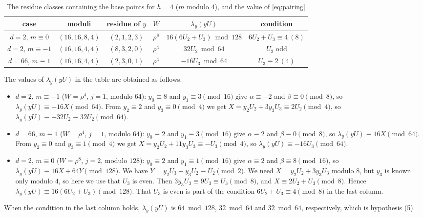 \documentclass[a4paper,11pt]{article}
\theoremstyle{plain}
\theoremstyle{definition}
\theoremstyle{remark}
\numberwithin{equation}{section}
\numberwithin{table}{section}
\begin{document}
\begin{table}[htbp]
\centering
\caption{The residue classes containing the base points for $h=4$ ($m$ modulo $4$), and the value of \eqref{eq:pairing}}\label{tab:phases}
\footnotesize\setlength{\tabcolsep}{2.5pt}
\begin{tabular}{cccccc}
\toprule
case & moduli & residue of $y$ & $W$ & $\lambda_y(yU)$ & condition\\
\midrule
$d=2$, $m\equiv0$ & $(16,16,8,4)$ & $(2,1,2,3)$ & $\rho^8$ & $16(6U_2+U_3)\bmod128$ & $6U_2+U_3\equiv4\ (8)$\\
$d=2$, $m\equiv-1$ & $(16,16,4,4)$ & $(8,3,2,0)$ & $\rho^4$ & $32U_2\bmod64$ & $U_2$ odd\\
$d=66$, $m\equiv1$ & $(16,16,4,4)$ & $(2,3,0,1)$ & $\rho^4$ & $-16U_3\bmod64$ & $U_3\equiv2\ (4)$\\
\bottomrule
\end{tabular}
\end{table}

The values of $\lambda_y(yU)$ in the table are obtained as follows.
\begin{itemize}
\item $d=2$, $m\equiv-1$ ($W=\rho^4$, $j=1$, modulo $64$): $y_0\equiv8$ and $y_1\equiv3\pmod{16}$ give $\alpha\equiv-2$ and $\beta\equiv0\pmod8$, so $\lambda_y(yU)\equiv-16X\pmod{64}$. From $y_2\equiv2$ and $y_3\equiv0\pmod4$ we get $X=y_2U_2+3y_3U_3\equiv2U_2\pmod4$, so $\lambda_y(yU)\equiv-32U_2\equiv32U_2\pmod{64}$.
\item $d=66$, $m\equiv1$ ($W=\rho^4$, $j=1$, modulo $64$): $y_0\equiv2$ and $y_1\equiv3\pmod{16}$ give $\alpha\equiv2$ and $\beta\equiv0\pmod8$, so $\lambda_y(yU)\equiv16X\pmod{64}$. From $y_2\equiv0$ and $y_3\equiv1\pmod4$ we get $X=y_2U_2+11y_3U_3\equiv-U_3\pmod4$, so $\lambda_y(yU)\equiv-16U_3\pmod{64}$.
\item $d=2$, $m\equiv0$ ($W=\rho^8$, $j=2$, modulo $128$): $y_0\equiv2$ and $y_1\equiv1\pmod{16}$ give $\alpha\equiv2$ and $\beta\equiv8\pmod{16}$, so $\lambda_y(yU)\equiv16X+64Y\pmod{128}$. We have $Y=y_2U_3+y_3U_2\equiv U_2\pmod2$. We need $X=y_2U_2+3y_3U_3$ modulo $8$, but $y_3$ is known only modulo $4$, so here we use that $U_3$ is even. Then $3y_3U_3\equiv9U_3\equiv U_3\pmod8$, and $X\equiv2U_2+U_3\pmod8$. Hence $\lambda_y(yU)\equiv16(6U_2+U_3)\pmod{128}$. That $U_3$ is even is part of the condition $6U_2+U_3\equiv4\pmod8$ in the last column.
\end{itemize}
When the condition in the last column holds, $\lambda_y(yU)$ is $64\bmod128$, $32\bmod64$ and $32\bmod64$, respectively, which is hypothesis (5).
\end{document}

